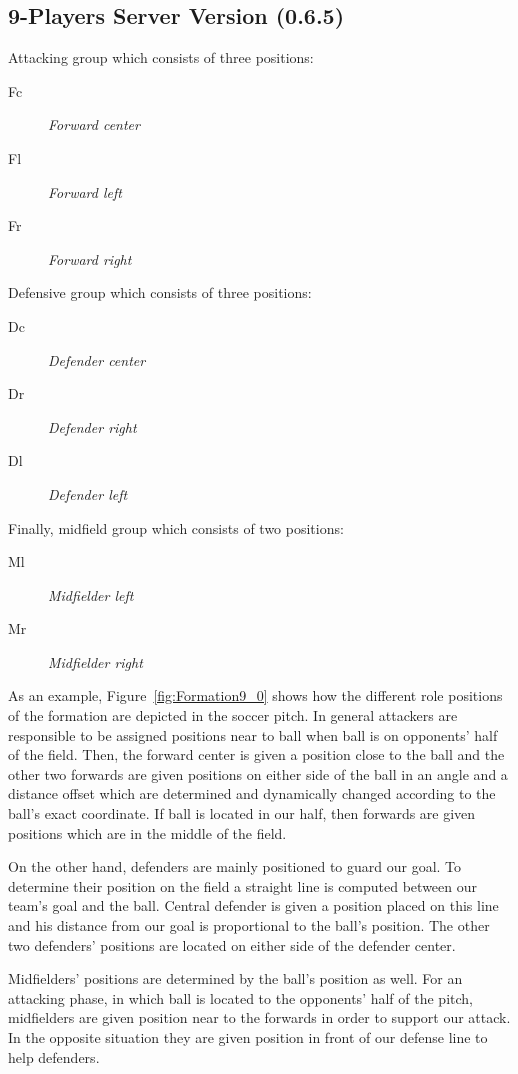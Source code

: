 \subsection{9-Players Server Version (0.6.5)}
Attacking group which consists of three positions:
\begin{description}
\item[Fc] \textit{Forward center}
\item[Fl] \textit{Forward left}
\item[Fr] \textit{Forward right}
\end{description}
Defensive group which consists of three positions:
\begin{description}
\item[Dc] \textit{Defender center}
\item[Dr] \textit{Defender right }
\item[Dl] \textit{Defender left}
\end{description}
Finally, midfield group which consists of two positions:
\begin{description}
\item[Ml] \textit{Midfielder left}
\item[Mr] \textit{Midfielder right}
\end{description}
As an example, Figure~\ref{fig:Formation9_0} shows how the different role positions of the formation are depicted in the soccer pitch. In general attackers are responsible to be assigned positions near to ball when ball is on opponents' half of the field. Then, the forward center  is given a position close to the ball and the other two forwards are given positions on either side of the ball in an angle and a distance offset which are determined and dynamically changed according to the ball's exact coordinate. If ball is located in our half, then forwards are given positions which are in the middle of the field. 

On the other hand, defenders are mainly positioned to guard our goal. To determine their position on the field a straight line is computed between our team's  goal and the ball. Central defender is given a position placed on this line and his distance from our goal is proportional to the ball's position. The other two defenders' positions are located on either side of the defender center. 

Midfielders' positions are determined by the ball's position as well. For an attacking phase, in which ball is located to the opponents' half of the pitch, midfielders are given position near to the forwards in order to support our attack. In the opposite situation they are given position in front of our defense line to help defenders. 

